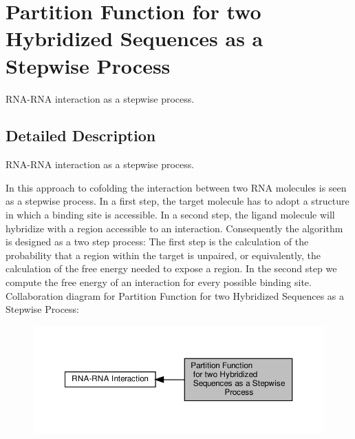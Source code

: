 \hypertarget{group__up__cofold}{}\section{Partition Function for two Hybridized Sequences as a Stepwise Process}
\label{group__up__cofold}


R\+N\+A-\/\+R\+NA interaction as a stepwise process.  




\subsection{Detailed Description}
R\+N\+A-\/\+R\+NA interaction as a stepwise process. 

In this approach to cofolding the interaction between two R\+NA molecules is seen as a stepwise process. In a first step, the target molecule has to adopt a structure in which a binding site is accessible. In a second step, the ligand molecule will hybridize with a region accessible to an interaction. Consequently the algorithm is designed as a two step process\+: The first step is the calculation of the probability that a region within the target is unpaired, or equivalently, the calculation of the free energy needed to expose a region. In the second step we compute the free energy of an interaction for every possible binding site. Collaboration diagram for Partition Function for two Hybridized Sequences as a Stepwise Process\+:
\nopagebreak
\begin{figure}[H]
\begin{center}
\leavevmode
\includegraphics[width=350pt]{group__up__cofold}
\end{center}
\end{figure}
